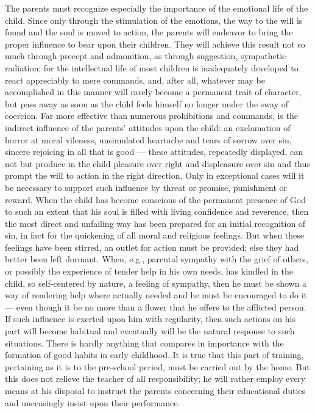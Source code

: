 The parents must recognize especially the importance of the emotional life of the child. Since only through the stimulation
of the emotions, the way to the will is found and the soul is moved to action, the parents will endeavor to bring the proper influence to bear upon their children. They will achieve this result not so much through precept and admonition, as through suggestion, sympathetic radiation; for the intellectual life of most children is inadequately developed to react appreciably to mere commands, and, after all, whatever may be accomplished in this manner will rarely become a permanent trait of character, but pass away as soon as the child feels himself no longer under the sway of coercion. Far more effective than numerous prohibitions and commands, is the indirect influence of the parents’ attitudes upon the child: an exclamation of horror at moral vileness, unsimulated heartache and tears of sorrow over sin, sincere rejoicing in all that is good — these attitudes, repeatedly displayed, can not but produce in the child pleasure over right and displeasure over sin and thus prompt the will to action in the right direction. Only in exceptional cases will it be necessary to support such influence by threat or promise, punishment or reward. When the child has become conscious of the permanent presence of God to such an extent that his soul is filled with living confidence and reverence, then the most direct and unfailing way has been prepared for an initial recognition of sin, in fact for the quickening of all moral and religious feelings. But when these feelings have been stirred, an outlet for action must be provided; else they had better been left dormant. When, e.g., parental sympathy with the grief of others, or possibly the experience of tender help in his own needs, has kindled in the child, so self-centered by nature, a feeling of sympathy, then he must be shown a way of rendering help where actually needed and he must be encouraged to do it — even though it be no more than a flower that he offers to the afflicted person. If such influence is exerted upon him with regularity, then such
actions on his part will become habitual and eventually will be the natural response to such situations. There is hardly anything that compares in importance with the formation of good habits in early childhood. It is true that this part of training, pertaining as it is to the pre-school period, must be carried out by the home. But this does not relieve the teacher of all responsibility; he will rather employ every means at his disposal to instruct the parents concerning their educational duties and unceasingly insist upon their performance.

